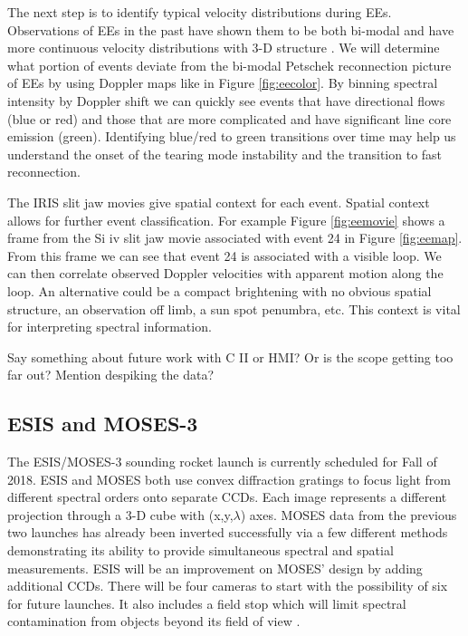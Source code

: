 \documentclass[]{aastex6}
\begin{document}
	
	The next step is to identify typical velocity distributions during EEs.  Observations of EEs in the past have shown them to be both bi-modal \citep{Innes1997,Rust2017} and have more continuous velocity distributions with 3-D structure \citep{Fox2010,Innes2015,Rouppe2017}.  We will determine what portion of events deviate from the bi-modal Petschek reconnection picture of EEs by using Doppler maps like in Figure \ref{fig:eecolor}. By binning spectral intensity by Doppler shift we can quickly see events that have directional flows (blue or red) and those that are more complicated and have significant line core emission (green).  Identifying blue/red to green transitions over time may help us understand the onset of the tearing mode instability and the transition to fast reconnection.
	
	The IRIS slit jaw movies give spatial context for each event.  Spatial context allows for further event classification. For example Figure \ref{fig:eemovie} shows a frame from the Si {\sc iv} slit jaw movie associated with event 24 in Figure \ref{fig:eemap}.  From this frame we can see that event 24 is associated with a visible loop.  We can then correlate observed Doppler velocities with apparent motion along the loop.  An alternative could be a compact brightening with no obvious spatial structure, an observation off limb, a sun spot penumbra, etc.  This context is vital for interpreting spectral information.
	
	Say something about future work with C II or HMI?  Or is the scope getting too far out?  Mention despiking the data?
	

	\subsection{ESIS and MOSES-3}
	The ESIS/MOSES-3 sounding rocket launch is currently scheduled for Fall of 2018.  ESIS and MOSES both use convex diffraction gratings to focus light from different spectral orders onto separate CCDs.  Each image represents a different projection through a 3-D cube with (x,y,$\lambda$) axes.  MOSES data from the previous two launches has already been inverted successfully via a few different methods \citep{Fox2010,Courrier2015,Smart2016,Smart2017,Rust2017} demonstrating its ability to provide simultaneous spectral and spatial measurements.  ESIS will be an improvement on MOSES' design by adding additional CCDs.  There will be four cameras to start with the possibility of six for future launches.  It also includes a field stop which will limit spectral contamination from objects beyond its field of view \citep{Parker2016}.
	
\end{document}
